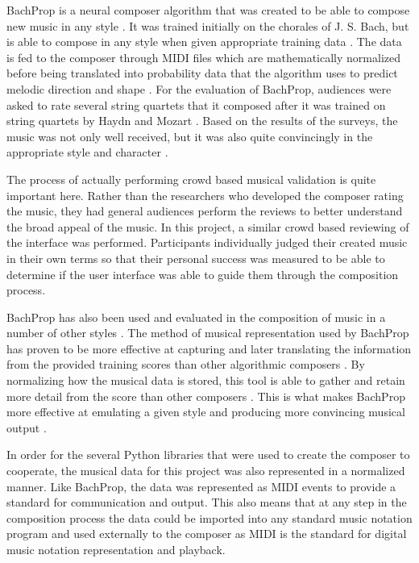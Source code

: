 BachProp is a neural composer algorithm that was created to be able to compose new music in any style \cite{Colombo_2018Com}.  It was trained initially on the chorales of J. S. Bach, but is able to compose in any style when given appropriate training data \cite{Colombo_2018Com}.  The data is fed to the composer through MIDI files which are mathematically normalized before being translated into probability data that the algorithm uses to predict melodic direction and shape \cite{Colombo_2018Com}.  For the evaluation of BachProp, audiences were asked to rate several string quartets that it composed after it was trained on string quartets by Haydn and Mozart \cite{Colombo_2018Com}.  Based on the results of the surveys, the music was not only well received, but it was also quite convincingly in the appropriate style and character \cite{Colombo_2018Com}.

\vspace{\baselineskip}

The process of actually performing crowd based musical validation is quite important here.  Rather than the researchers who developed the composer rating the music, they had general audiences perform the reviews to better understand the broad appeal of the music.  In this project, a similar crowd based reviewing of the interface was performed.  Participants individually judged their created music in their own terms so that their personal success was measured to be able to determine if the user interface was able to guide them through the composition process.

\vspace{\baselineskip}

BachProp has also been used and evaluated in the composition of music in a number of other styles \cite{Colombo_2018Gen}.  The method of musical representation used by BachProp has proven to be more effective at capturing and later translating the information from the provided training scores than other algorithmic composers \cite{Colombo_2018Gen}.  By normalizing how the musical data is stored, this tool is able to gather and retain more detail from the score than other composers \cite{Colombo_2018Gen}.  This is what makes BachProp more effective at emulating a given style and producing more convincing musical output \cite{Colombo_2018Gen}.

\vspace{\baselineskip}

In order for the several Python libraries that were used to create the composer to cooperate, the musical data for this project was also represented in a normalized manner.  Like BachProp, the data was represented as MIDI events to provide a standard for communication and output.  This also means that at any step in the composition process the data could be imported into any standard music notation program and used externally to the composer as MIDI is the standard for digital music notation representation and playback.

